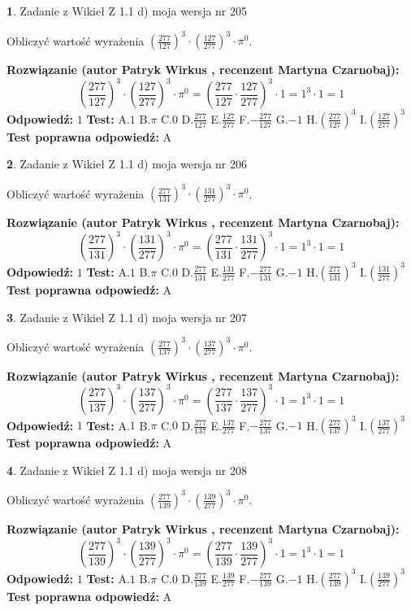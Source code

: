 \documentclass[12pt, a4paper]{article}
\theoremstyle{definition} %
\newtheorem{zad}{}
\newcommand{\zadStart}[1]{\begin{zad}#1\newline}
\newcommand{\zadStop}{\end{zad}}
\newcommand{\rozwStart}[2]{\noindent \textbf{Rozwiązanie (autor #1 , recenzent #2): }\newline}
\newcommand{\rozwStop}{\newline}
\newcommand{\odpStart}{\noindent \textbf{Odpowiedź:}\newline}
\newcommand{\odpStop}{\newline}
\newcommand{\testStart}{\noindent \textbf{Test:}\newline}
\newcommand{\testStop}{\newline}
\newcommand{\kluczStart}{\noindent \textbf{Test poprawna odpowiedź:}\newline}
\newcommand{\kluczStop}{\newline}
\begin{document}
\zadStart{Zadanie z Wikieł Z 1.1 d) moja wersja nr 205}

Obliczyć wartość wyrażenia $(\frac{277}{127})^{3} \cdot (\frac{127}{277})^{3} \cdot \pi^{0}$.
\zadStop
\rozwStart{Patryk Wirkus}{Martyna Czarnobaj}
$$(\frac{277}{127})^{3} \cdot (\frac{127}{277})^{3} \cdot \pi^{0} = (\frac{277}{127} \cdot \frac{127}{277})^{3} \cdot 1 = 1^{3} \cdot 1 = 1$$
\rozwStop
\odpStart
$1$
\odpStop
\testStart
A.$1$ B.$\pi$ C.$0$ D.$\frac{277}{127}$ E.$\frac{127}{277}$
F.$-\frac{277}{127}$ G.$-1$
H.$(\frac{277}{127})^{3}$
I.$(\frac{127}{277})^{3}$
\testStop
\kluczStart
A
\kluczStop



\zadStart{Zadanie z Wikieł Z 1.1 d) moja wersja nr 206}

Obliczyć wartość wyrażenia $(\frac{277}{131})^{3} \cdot (\frac{131}{277})^{3} \cdot \pi^{0}$.
\zadStop
\rozwStart{Patryk Wirkus}{Martyna Czarnobaj}
$$(\frac{277}{131})^{3} \cdot (\frac{131}{277})^{3} \cdot \pi^{0} = (\frac{277}{131} \cdot \frac{131}{277})^{3} \cdot 1 = 1^{3} \cdot 1 = 1$$
\rozwStop
\odpStart
$1$
\odpStop
\testStart
A.$1$ B.$\pi$ C.$0$ D.$\frac{277}{131}$ E.$\frac{131}{277}$
F.$-\frac{277}{131}$ G.$-1$
H.$(\frac{277}{131})^{3}$
I.$(\frac{131}{277})^{3}$
\testStop
\kluczStart
A
\kluczStop



\zadStart{Zadanie z Wikieł Z 1.1 d) moja wersja nr 207}

Obliczyć wartość wyrażenia $(\frac{277}{137})^{3} \cdot (\frac{137}{277})^{3} \cdot \pi^{0}$.
\zadStop
\rozwStart{Patryk Wirkus}{Martyna Czarnobaj}
$$(\frac{277}{137})^{3} \cdot (\frac{137}{277})^{3} \cdot \pi^{0} = (\frac{277}{137} \cdot \frac{137}{277})^{3} \cdot 1 = 1^{3} \cdot 1 = 1$$
\rozwStop
\odpStart
$1$
\odpStop
\testStart
A.$1$ B.$\pi$ C.$0$ D.$\frac{277}{137}$ E.$\frac{137}{277}$
F.$-\frac{277}{137}$ G.$-1$
H.$(\frac{277}{137})^{3}$
I.$(\frac{137}{277})^{3}$
\testStop
\kluczStart
A
\kluczStop



\zadStart{Zadanie z Wikieł Z 1.1 d) moja wersja nr 208}

Obliczyć wartość wyrażenia $(\frac{277}{139})^{3} \cdot (\frac{139}{277})^{3} \cdot \pi^{0}$.
\zadStop
\rozwStart{Patryk Wirkus}{Martyna Czarnobaj}
$$(\frac{277}{139})^{3} \cdot (\frac{139}{277})^{3} \cdot \pi^{0} = (\frac{277}{139} \cdot \frac{139}{277})^{3} \cdot 1 = 1^{3} \cdot 1 = 1$$
\rozwStop
\odpStart
$1$
\odpStop
\testStart
A.$1$ B.$\pi$ C.$0$ D.$\frac{277}{139}$ E.$\frac{139}{277}$
F.$-\frac{277}{139}$ G.$-1$
H.$(\frac{277}{139})^{3}$
I.$(\frac{139}{277})^{3}$
\testStop
\kluczStart
A
\kluczStop
\end{document}
